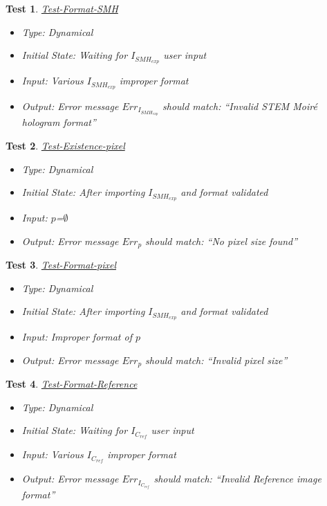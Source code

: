 \documentclass[12pt, titlepage]{article}
\newtheorem{Test}{Test}
\begin{document}
\begin{Test}\normalfont\underline{Test-Format-SMH}
\begin{itemize}
\item Type: Dynamical
\item Initial State: Waiting for $I_{SMH_{exp}}$ user input
\item Input: Various $I_{SMH_{exp}}$ improper format
\item Output: Error message $Err_{I_{SMH_{exp}}}$ should match: \enquote{Invalid STEM Moir{\'e} hologram format}
\end{itemize}
\end{Test}

\begin{Test}\normalfont\underline{Test-Existence-pixel}
\begin{itemize}
\item Type: Dynamical
\item Initial State: After importing $I_{SMH_{exp}}$ and format validated
\item Input: $p$=$\emptyset$
\item Output: Error message $Err_{p}$ should match: \enquote{No pixel size found}
\end{itemize}
\end{Test}

\begin{Test}\normalfont\underline{Test-Format-pixel}
\begin{itemize}
\item Type: Dynamical
\item Initial State: After importing $I_{SMH_{exp}}$ and format validated
\item Input: Improper format of $p$
\item Output: Error message $Err_{p}$ should match: \enquote{Invalid pixel size}
\end{itemize}
\end{Test}


\begin{Test}\normalfont\underline{Test-Format-Reference}
\begin{itemize}
\item Type: Dynamical
\item Initial State: Waiting for $I_{C_{ref}}$ user input
\item Input: Various $I_{C_{ref}}$ improper format
\item Output: Error message $Err_{I_{C_{ref}}}$ should match: \enquote{Invalid Reference image format}
\end{itemize}
\end{Test}
\end{document}
